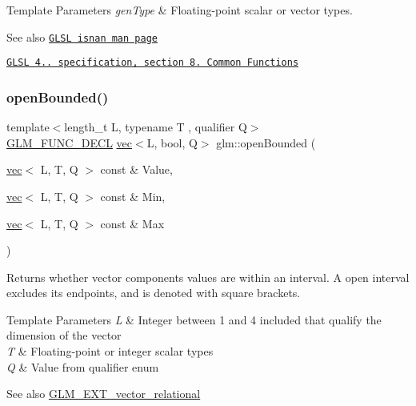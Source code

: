 \begin{DoxyTemplParams}{Template Parameters}
{\em gen\+Type} & Floating-\/point scalar or vector types.\\
\hline
\end{DoxyTemplParams}
\begin{DoxySeeAlso}{See also}
\href{http://www.opengl.org/sdk/docs/manglsl/xhtml/isnan.xml}{\tt G\+L\+SL isnan man page} 

\href{http://www.opengl.org/registry/doc/GLSLangSpec.4.20.8.pdf}{\tt G\+L\+SL 4.. specification, section 8. Common Functions} 
\end{DoxySeeAlso}
\mbox{\label{group__gtx__common_gafd303042ba2ba695bf53b2315f53f93f}} 
\subsubsection{\texorpdfstring{open\+Bounded()}{openBounded()}}
{\footnotesize\ttfamily template$<$length\+\_\+t L, typename T , qualifier Q$>$ \\
\mbox{\hyperlink{setup_8hpp_ab2d052de21a70539923e9bcbf6e83a51}{G\+L\+M\+\_\+\+F\+U\+N\+C\+\_\+\+D\+E\+CL}} \mbox{\hyperlink{structglm_1_1vec}{vec}}$<$L, bool, Q$>$ glm\+::open\+Bounded (\begin{DoxyParamCaption}\item[{\mbox{\hyperlink{structglm_1_1vec}{vec}}$<$ L, T, Q $>$ const \&}]{Value,  }\item[{\mbox{\hyperlink{structglm_1_1vec}{vec}}$<$ L, T, Q $>$ const \&}]{Min,  }\item[{\mbox{\hyperlink{structglm_1_1vec}{vec}}$<$ L, T, Q $>$ const \&}]{Max }\end{DoxyParamCaption})}

Returns whether vector components values are within an interval. A open interval excludes its endpoints, and is denoted with square brackets.


\begin{DoxyTemplParams}{Template Parameters}
{\em L} & Integer between 1 and 4 included that qualify the dimension of the vector \\
\hline
{\em T} & Floating-\/point or integer scalar types \\
\hline
{\em Q} & Value from qualifier enum\\
\hline
\end{DoxyTemplParams}
\begin{DoxySeeAlso}{See also}
\mbox{\hyperlink{group__ext__vector__relational}{G\+L\+M\+\_\+\+E\+X\+T\+\_\+vector\+\_\+relational}} 
\end{DoxySeeAlso}
